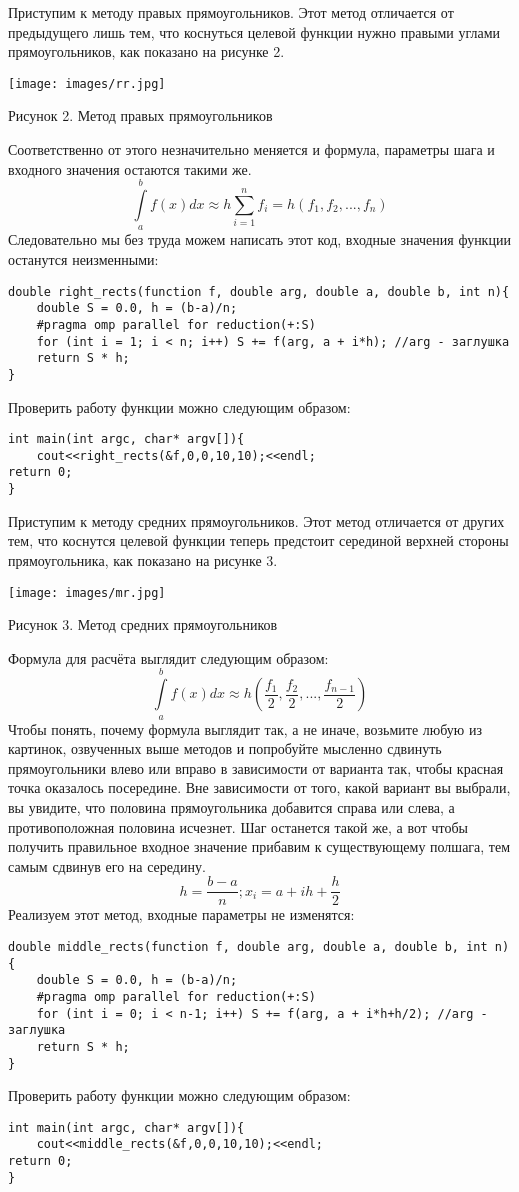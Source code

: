 \documentclass{article}
\begin{document}
Приступим к методу правых прямоугольников. Этот метод отличается от предыдущего лишь тем, что коснуться целевой функции нужно правыми углами прямоугольников, как показано на рисунке 2.
\begin{center}
\texttt{[image: images/rr.jpg]}

Рисунок 2. Метод правых прямоугольников
\end{center}
Соответственно от этого незначительно меняется и формула, параметры шага и входного значения остаются такими же.
$$\int\limits_a^b f(x)dx \approx h\sum_{i=1}^{n}f_i = h(f_1,f_2,...,f_{n})$$
Следовательно мы без труда можем написать этот код, входные значения функции останутся неизменными:
\begin{lstlisting}
double right_rects(function f, double arg, double a, double b, int n){
    double S = 0.0, h = (b-a)/n;
    #pragma omp parallel for reduction(+:S)
    for (int i = 1; i < n; i++) S += f(arg, a + i*h); //arg - заглушка
    return S * h;
}
\end{lstlisting}
Проверить работу функции можно следующим образом:
\begin{lstlisting}
int main(int argc, char* argv[]){
    cout<<right_rects(&f,0,0,10,10);<<endl;
return 0;
}
\end{lstlisting}
Приступим к методу средних прямоугольников. Этот метод отличается от других тем, что
коснутся целевой функции теперь предстоит серединой верхней стороны прямоугольника, как показано на рисунке 3.
\begin{center}
\texttt{[image: images/mr.jpg]}

Рисунок 3. Метод средних прямоугольников
\end{center}
Формула для расчёта выглядит следующим образом:
$$\int\limits_a^b f(x)dx \approx h(\frac{f_1}{2},\frac{f_2}{2},...,\frac{f_{n-1}}{2})$$
Чтобы понять, почему формула выглядит так, а не иначе, возьмите любую из картинок, озвученных выше методов и попробуйте мысленно сдвинуть прямоугольники влево или вправо в зависимости от варианта так, чтобы красная точка оказалось посередине. Вне зависимости от того, какой вариант вы выбрали, вы увидите, что половина прямоугольника добавится справа или слева, а противоположная половина исчезнет.
Шаг останется такой же, а вот чтобы получить правильное входное значение прибавим к существующему полшага, тем самым сдвинув его на середину.
$$h = \frac{b-a}{n}; x_i = a+ih+\frac{h}{2}$$
Реализуем этот метод, входные параметры не изменятся:
\begin{lstlisting}
double middle_rects(function f, double arg, double a, double b, int n){
    double S = 0.0, h = (b-a)/n;
    #pragma omp parallel for reduction(+:S)
    for (int i = 0; i < n-1; i++) S += f(arg, a + i*h+h/2); //arg - заглушка
    return S * h;
}
\end{lstlisting}
Проверить работу функции можно следующим образом:
\begin{lstlisting}
int main(int argc, char* argv[]){
    cout<<middle_rects(&f,0,0,10,10);<<endl;
return 0;
}
\end{lstlisting}
\end{document}
